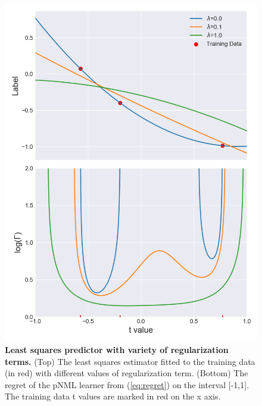 \documentclass[conference,letterpaper]{IEEEtran}
\begin{document}
\begin{figure}[h] 
    \centering
    \includegraphics[width=\linewidth]{figures/least_sqaures_with_regularization.jpg}
    \caption{\textbf{Least squares predictor with variety of regularization terms.} (Top) The least squares estimator fitted to the training data (in red) with different values of regularization term. (Bottom) The regret of the pNML learner from (\ref{eq:regret}) on the interval [-1,1]. The training data t values are marked in red on the x axis.}
    \label{fig:least_squares_with_reg}
\end{figure}
\end{document}
